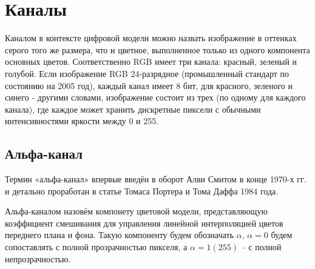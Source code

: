 \begin{figure}[ht!]
\end{figure}

\section{Каналы}
Каналом в контексте цифровой модели можно назвать изображение в оттенках серого того же размера, что и цветное, выполненное только из одного компонента основных цветов. Соответственно RGB имеет три канала: красный, зеленый и голубой. Если изображение RGB 24-разрядное (промышленный стандарт по состоянию на 2005 год), каждый канал имеет 8 бит, для красного, зеленого и синего - другими словами, изображение состоит из трех (по одному для каждого канала), где каждое может хранить дискретные пиксели с обычными интенсивностями яркости между 0 и 255. 

\subsection{Альфа-канал}
Термин «альфа-канал» впервые введён в оборот Алви Смитом в конце 1970-х гг. и детально проработан в статье Томаса Портера и Тома Даффа 1984 года.

Альфа-каналом назовём компонету цветовой модели, представляющую коэффициент смешивания для управления линейной интерполяцией цветов переднего плана и фона. Такую компоненту будем обозначать $\alpha$, $\alpha = 0$ будем сопоставлять с полной прозрачностью пикселя, а $\alpha=1 (255)$ -- с полной непрозрачностью. \cite{bib1} 

